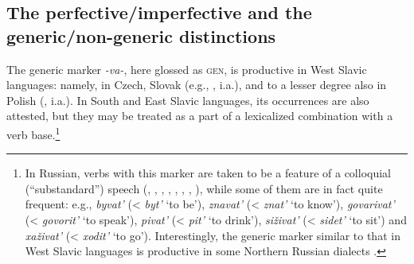 \documentclass[output=paper,colorlinks,citecolor=brown]{langscibook}
\begin{document}
\subsection{The perfective/imperfective and the generic/non-generic distinctions} 
\largerpage[-1]
The generic marker \textit{-va-}, here glossed as \textsc{gen}, is productive in West Slavic languages: namely, in Czech, Slovak (e.g., \citealt{kucera1981aspect,bily1986iterative}, i.a.), and to a lesser degree also in Polish (\citealt{bily1986iterative}, i.a.). 
In South and East Slavic languages, its occurrences are also
attested, but they may be treated as a part of a lexicalized combination with a verb base.\footnote{In Russian, 
verbs with this marker are taken to be a feature of a colloquial (``substandard'') speech (\citealt[405--407]{isacenko1962}, \citealt[28 and 168--171]{Forsyth1970}, \citealt[27]{Comrie1976},  \citealt[177]{kucera1981aspect}, \citealt{bily1985preliminaries}, \citealt[413--414]{vinogradov1986russian}, \citealt{petr1986mluvnice}, \citealt{bily1986iterative}),
while some of them are in fact quite frequent: e.g., \textit{byvat’} (< \textit{byt’} `to be'), \textit{znavat’} (< \textit{znat’}  `to know'), \textit{govarivat'} (< \textit{govorit'} `to speak'), \textit{pivat'}
(< \textit{pit'} `to drink'), \textit{siživat'} (< \textit{sidet'} `to sit') and \textit{xaživat'} (< \textit{xodit'} `to go'). Interestingly, the generic marker similar to that in West Slavic languages is productive in some Northern Russian dialects \citep{barnetova1956nasobenost}.}
\end{document}
